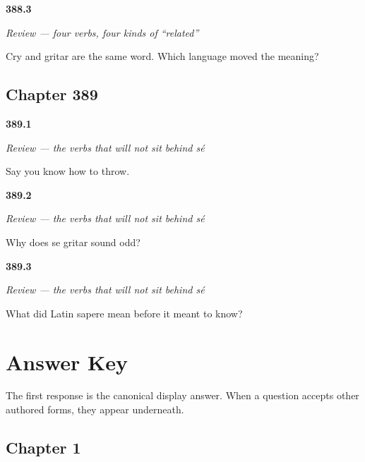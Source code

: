 \noindent\begin{minipage}[t]{\linewidth}
\raggedright
\hypertarget{review-ES-C388-repaso-cuatro-hedges-moved}{\textbf{388.3}} \emph{Review — four verbs, four kinds of \textquotedblleft{}related\textquotedblright{}}\par
\small Cry and gritar are the same word. Which language moved the meaning?
\end{minipage}\par\medskip

\section*{Chapter 389}

\noindent\begin{minipage}[t]{\linewidth}
\raggedright
\hypertarget{review-ES-C389-repaso-se-y-puedo-skill}{\textbf{389.1}} \emph{Review — the verbs that will not sit behind \emph{sé}}\par
\small Say you know how to throw.
\end{minipage}\par\medskip

\noindent\begin{minipage}[t]{\linewidth}
\raggedright
\hypertarget{review-ES-C389-repaso-se-y-puedo-odd}{\textbf{389.2}} \emph{Review — the verbs that will not sit behind \emph{sé}}\par
\small Why does se gritar sound odd?
\end{minipage}\par\medskip

\noindent\begin{minipage}[t]{\linewidth}
\raggedright
\hypertarget{review-ES-C389-repaso-se-y-puedo-taste}{\textbf{389.3}} \emph{Review — the verbs that will not sit behind \emph{sé}}\par
\small What did Latin sapere mean before it meant to know?
\end{minipage}\par\medskip

\chapter*{Answer Key}

The first response is the canonical display answer. When a question accepts other authored forms, they appear underneath.

\section*{Chapter 1}

